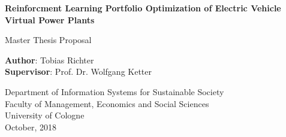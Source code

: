 \begin{titlepage}
    \begin{center}
        \vspace*{1cm}

        \Large
        \textbf{Reinforcment Learning Portfolio Optimization of Electric Vehicle Virtual Power Plants}

        \vspace{1.5cm}
        Master Thesis Proposal

        \vspace{8.0cm}

        \large
        \textbf{Author}: Tobias Richter\\
        \large
        \textbf{Supervisor}: Prof. Dr. Wolfgang Ketter

        \vspace{1cm}
        \large
        Department of Information Systems for Sustainable Society\\
        Faculty of Management, Economics and Social Sciences\\
        University of Cologne\\

        \vspace{1cm}
        October, 2018

    \end{center}
\end{titlepage}
